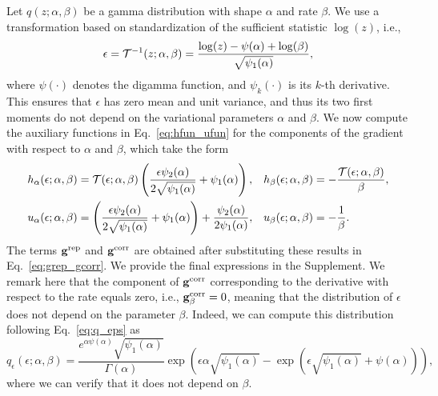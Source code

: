 Let $q(z;\alpha,\beta)$ be a gamma distribution with shape $\alpha$ and rate $\beta$. We use a transformation based on standardization of the sufficient statistic $\log(z)$, i.e.,
\begin{equation}
	\epsilon=\mathcal{T}^{-1}(z;\alpha,\beta)=\frac{\log(z)-\psi(\alpha)+\log(\beta)}{\sqrt{\psi_1(\alpha)}},\nonumber
\end{equation}
where $\psi(\cdot)$ denotes the digamma function, and $\psi_k(\cdot)$ is its $k$-th derivative. This ensures that $\epsilon$ has zero mean and unit variance, and thus its two first moments do not depend on the variational parameters $\alpha$ and $\beta$. We now compute the auxiliary functions in Eq.~\ref{eq:hfun_ufun} for the components of the gradient with respect to $\alpha$ and $\beta$, which take the form
\begin{align}
    & h_{\alpha}(\epsilon;\alpha,\beta) = \mathcal{T}(\epsilon;\alpha,\beta) \left( \frac{\epsilon\psi_2(\alpha)}{2\sqrt{\psi_1(\alpha)}}+\psi_1(\alpha)\right),
    & & h_{\beta}(\epsilon;\alpha,\beta) = -\frac{\mathcal{T}(\epsilon;\alpha,\beta)}{\beta}, \nonumber \\
    & u_{\alpha}(\epsilon;\alpha,\beta) = \left( \frac{\epsilon\psi_2(\alpha)}{2\sqrt{\psi_1(\alpha)}}+\psi_1(\alpha)\right)+\frac{\psi_2(\alpha)}{2\psi_1(\alpha)},
    & & u_{\beta}(\epsilon;\alpha,\beta) = -\frac{1}{\beta}.\nonumber
\end{align}
The terms $\mathbf{g}^{\textrm{rep}}$ and $\mathbf{g}^{\textrm{corr}}$ are obtained after substituting these results in Eq.~\ref{eq:grep_gcorr}. We provide the final expressions in the Supplement. We remark here that the component of $\mathbf{g}^{\textrm{corr}}$ corresponding to the derivative with respect to the rate equals zero, i.e., $\mathbf{g}^{\textrm{corr}}_{\beta}=0$, meaning that the distribution of $\epsilon$ does not depend on the parameter $\beta$. Indeed, we can compute this distribution following Eq.~\ref{eq:q_eps} as
\begin{equation}
	q_{\epsilon}(\epsilon;\alpha,\beta)= \frac{e^{\alpha\psi(\alpha)}\sqrt{\psi_1(\alpha)}}{\Gamma(\alpha)} \exp\left(\epsilon\alpha\sqrt{\psi_1(\alpha)}-\exp\left( \epsilon\sqrt{\psi_1(\alpha)}+\psi(\alpha) \right)\right),\nonumber
\end{equation}
where we can verify that it does not depend on $\beta$.

